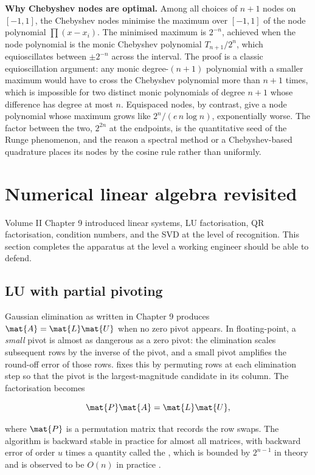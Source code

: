 \begin{mastery}
\textbf{Why Chebyshev nodes are optimal.} Among all choices of $n +
1$ nodes on $[-1, 1]$, the Chebyshev nodes minimise the maximum
over $[-1, 1]$ of the node polynomial $\prod(x - x_{i})$. The
minimised maximum is $2^{-n}$, achieved when the node polynomial is
the monic Chebyshev polynomial $T_{n+1}/2^{n}$, which equioscillates
between $\pm 2^{-n}$ across the interval. The proof is a classic
equioscillation argument: any monic degree-$(n+1)$ polynomial with a
smaller maximum would have to cross the Chebyshev polynomial more
than $n + 1$ times, which is impossible for two distinct monic
polynomials of degree $n + 1$ whose difference has degree at most
$n$. Equispaced nodes, by contrast, give a node polynomial whose
maximum grows like $2^{n}/(e\, n \log n)$, exponentially worse. The
factor between the two, $2^{2n}$ at the endpoints, is the
quantitative seed of the Runge phenomenon, and the reason a
spectral method or a Chebyshev-based quadrature places its nodes by
the cosine rule rather than uniformly.
\end{mastery}

\section{Numerical linear algebra revisited}

Volume II Chapter 9 introduced linear systems, LU factorisation,
QR factorisation, condition numbers, and the SVD at the level of
recognition. This section completes the apparatus at the level a
working engineer should be able to defend.

\subsection{LU with partial pivoting}

Gaussian elimination as written in Chapter 9 produces $\mat{A} =
\mat{L}\mat{U}$ when no zero pivot appears. In floating-point, a
\emph{small} pivot is almost as dangerous as a zero pivot: the
elimination scales subsequent rows by the inverse of the pivot,
and a small pivot amplifies the round-off error of those rows.
 fixes this by permuting rows at each
elimination step so that the pivot is the largest-magnitude
candidate in its column. The factorisation becomes

\[
\mat{P}\mat{A} = \mat{L}\mat{U},
\]

where $\mat{P}$ is a permutation matrix that records the row
swaps. The algorithm is backward stable in practice for almost all
matrices, with backward error of order $u$ times a quantity called
the , which is bounded by $2^{n-1}$ in
theory and is observed to be $O(n)$ in practice
\cite[ch.~22]{text:higham-numerical}.

